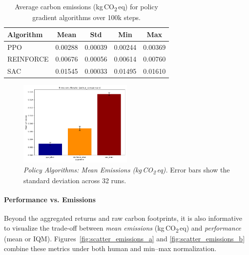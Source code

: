\begin{table} 
	\centering
	\caption{Average carbon emissions (kg\,CO\textsubscript{2}\,eq) for policy gradient algorithms over 100k steps.}
	\label{tab:policy_emissions}
	\begin{tabular}{lcccc}
		\toprule
		\textbf{Algorithm} & \textbf{Mean} & \textbf{Std} & \textbf{Min} & \textbf{Max} \\
		\midrule
		PPO         & 0.00288 & 0.00039 & 0.00244 & 0.00369 \\
		REINFORCE   & 0.00676 & 0.00056 & 0.00614 & 0.00760 \\
		SAC         & 0.01545 & 0.00033 & 0.01495 & 0.01610 \\
		\bottomrule
	\end{tabular}
\end{table}

\begin{figure} 
	\centering
	\includegraphics[width=0.5\textwidth]{figures/policy_comparison/barplot_emissions_policy_comparison.png}
	\caption{\emph{Policy Algorithms: Mean Emissions (kg\,CO\textsubscript{2}\,eq).} Error bars show the standard deviation across 32 runs.}
	\label{fig:policy_emissions_bar}
\end{figure}

\paragraph{Performance vs. Emissions}
Beyond the aggregated returns and raw carbon footprints, it is also informative to visualize the trade‐off between \emph{mean emissions} (kg\,CO\textsubscript{2}\,eq) and \emph{performance} (mean or IQM). Figures~\ref{fig:scatter_emissions_a} and \ref{fig:scatter_emissions_b} combine these metrics under both human and min–max normalization.

